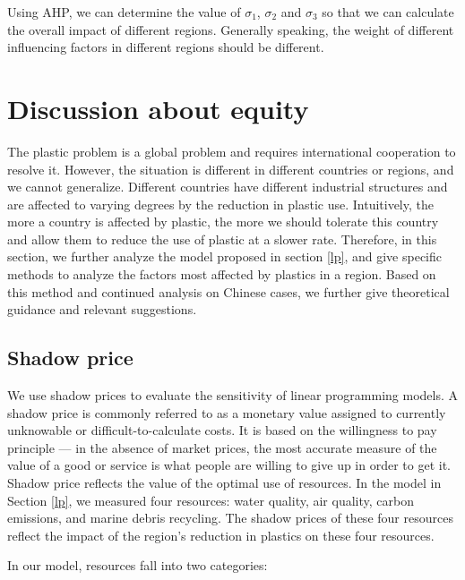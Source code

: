 \documentclass{mcmthesis}
\begin{document}
Using AHP, we can determine the value of $\sigma_1$, $\sigma_2$ and $\sigma_3$ so that we can calculate the overall impact of different regions. Generally speaking, the weight of different influencing factors in different regions should be different.

\section{Discussion about equity}

The plastic problem is a global problem and requires international cooperation to resolve it. However, the situation is different in different countries or regions, and we cannot generalize. Different countries have different industrial structures and are affected to varying degrees by the reduction in plastic use. Intuitively, the more a country is affected by plastic, the more we should tolerate this country and allow them to reduce the use of plastic at a slower rate. Therefore, in this section, we further analyze the model proposed in section \ref{lp}, and give specific methods to analyze the factors most affected by plastics in a region. Based on this method and continued analysis on Chinese cases, we further give theoretical guidance and relevant suggestions.

\subsection{Shadow price}

We use shadow prices to evaluate the sensitivity of linear programming models. A shadow price is commonly referred to as a monetary value assigned to currently unknowable or difficult-to-calculate costs. It is based on the willingness to pay principle — in the absence of market prices, the most accurate measure of the value of a good or service is what people are willing to give up in order to get it\cite{sp}. Shadow price reflects the value of the optimal use of resources. In the model in Section \ref{lp}, we measured four resources: water quality, air quality, carbon emissions, and marine debris recycling. The shadow prices of these four resources reflect the impact of the region's reduction in plastics on these four resources. 

In our model, resources fall into two categories:
\end{document}
